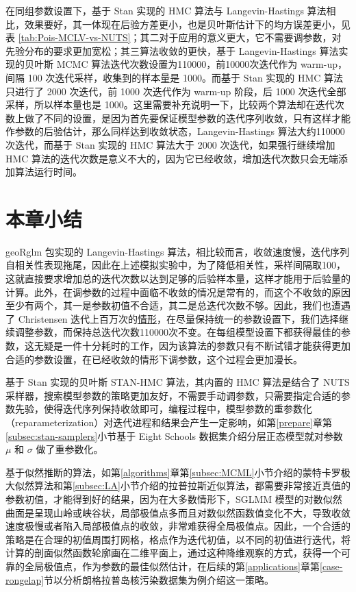 \documentclass[12pt,a4paper,UTF8,twoside]{book}
\theoremstyle{definition}
\theoremstyle{definition}
\theoremstyle{definition}
\theoremstyle{remark}
\begin{document}
在同组参数设置下，基于 Stan 实现的 HMC 算法与 Langevin-Hastings
算法相比，效果要好，其一体现在后验方差更小，也是贝叶斯估计下的均方误差更小，见表
\ref{tab:Pois-MCLV-vs-NUTS}；其二对于应用的意义更大，它不需要调参数，对先验分布的要求更加宽松；其三算法收敛的更快，基于
Langevin-Hastings 算法实现的贝叶斯 MCMC
算法迭代次数设置为110000，前10000次迭代作为 warm-up，间隔 100
次迭代采样，收集到的样本量是 1000。而基于 Stan 实现的 HMC 算法只进行了
2000 次迭代，前 1000 次迭代作为 warm-up 阶段，后 1000
次迭代全部采样，所以样本量也是
1000。这里需要补充说明一下，比较两个算法却在迭代次数上做了不同的设置，是因为首先要保证模型参数的迭代序列收敛，只有这样才能作参数的后验估计，那么同样达到收敛状态，Langevin-Hastings
算法大约110000次迭代，而基于 Stan 实现的 HMC 算法大于 2000
次迭代，如果强行继续增加 HMC
算法的迭代次数是意义不大的，因为它已经收敛，增加迭代次数只会无端添加算法运行时间。

\hypertarget{sec:simulations}{%
\section{本章小结}\label{sec:simulations}}

geoRglm 包实现的 Langevin-Hastings
算法，相比较而言，收敛速度慢，迭代序列自相关性表现拖尾，因此在上述模拟实验中，为了降低相关性，采样间隔取100，这就直接要求增加总的迭代次数以达到足够的后验样本量，这样才能用于后验量的计算。此外，在调参数的过程中面临不收敛的情况是常有的，而这个不收敛的原因至少有两个，其一是参数初值不合适，其二是总迭代次数不够。因此，我们也遭遇了
Christensen
迭代上百万次的\href{http://gbi.agrsci.dk/~ofch/geoRglm/Intro/books.html}{情形}，在尽量保持统一的参数设置下，我们选择继续调整参数，而保持总迭代次数110000次不变。在每组模型设置下都获得最佳的参数，这无疑是一件十分耗时的工作，因为该算法的参数只有不断试错才能获得更加合适的参数设置，在已经收敛的情形下调参数，这个过程会更加漫长。

基于 Stan 实现的贝叶斯 STAN-HMC 算法，其内置的 HMC 算法是结合了 NUTS
采样器\citep{hoffman2014}，搜索模型参数的策略更加友好，不需要手动调参数，只需要指定合适的参数先验，使得迭代序列保持收敛即可，编程过程中，模型参数的重参数化（reparameterization）对迭代进程和结果会产生一定影响，如第\ref{prepare}章第\ref{subsec:stan-samplers}小节基于
Eight Schools 数据集介绍分层正态模型就对参数 \(\mu\) 和 \(\sigma\)
做了重参数化。

基于似然推断的算法，如第\ref{algorithms}章第\ref{subsec:MCML}小节介绍的蒙特卡罗极大似然算法和第\ref{subsec:LA}小节介绍的拉普拉斯近似算法，都需要非常接近真值的参数初值，才能得到好的结果，因为在大多数情形下，SGLMM
模型的对数似然曲面是呈现山岭或峡谷状，局部极值点多而且对数似然函数值变化不大，导致收敛速度极慢或者陷入局部极值点的收敛，非常难获得全局极值点。因此，一个合适的策略是在合理的初值周围打网格，格点作为迭代初值，以不同的初值进行迭代，将计算的剖面似然函数轮廓画在二维平面上，通过这种降维观察的方式，获得一个可靠的全局极值点，作为参数的最佳似然估计，在后续的第\ref{applications}章第\ref{case-rongelap}节以分析朗格拉普岛核污染数据集为例介绍这一策略。
\end{document}
